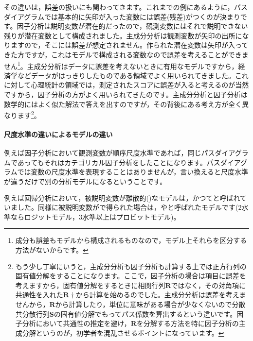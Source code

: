 \documentclass{ltjsbook}
\begin{document}
その違いは，誤差の扱いにも関わってきます。これまでの例にあるように，パスダイアグラムでは基本的に矢印が入った変数には誤差(残差)がつくのが決まりです。因子分析は説明変数が潜在的だったので，観測変数にはそれで説明できない残りが潜在変数として構成されました。主成分分析は観測変数が矢印の出所になりますので，そこには誤差が想定されません。作られた潜在変数は矢印が入ってきた方ですが，これはモデルで構成される変数なので誤差を考えることができません\footnote{成分も誤差もモデルから構成されるものなので，モデル上それらを区分する方法がないからです。}。主成分分析はデータに誤差を考えないときに有用なモデルですから，経済学などデータがはっきりしたものである領域でよく用いられてきました。これに対して心理統計の領域では，測定されたスコアに誤差が入ると考えるのが当然ですから，因子分析の方がよく用いられてきたのです。主成分分析と因子分析は数学的にはよく似た解法で答えを出すのですが，その背後にある考え方が全く異なります\footnote{もう少し丁寧にいうと，主成分分析も因子分析も計算する上では正方行列の固有値分解をすることになります。ここで，因子分析の場合は項目に誤差を考えますから，固有値分解をするときに相関行列$\bm{R}$ではなく，その対角項に共通性を入れた$\bm{R}\dagger$から計算を始めるのでした。主成分分析は誤差を考えませんから，$\bm{R}$から計算したり，単位に意味がある場合が少なくないので分散共分散行列$\bm{S}$の固有値分解でもってパス係数を算出するという違いです。因子分析において共通性の推定を避け，$\bm{R}$を分解する方法を特に因子分析の主成分解というのが，初学者を混乱させるポイントになっています。}。

\paragraph{尺度水準の違いによるモデルの違い}

例えば因子分析において観測変数が順序尺度水準であれば，同じパスダイアグラムであってもそれはカテゴリカル因子分析をしたことになります。パスダイアグラムでは変数の尺度水準を表現することはありませんが，言い換えると尺度水準が違うだけで別の分析モデルになるということです。

例えば回帰分析において，被説明変数が離散的()なモデルは，かつてと呼ばれていました。同様に被説明変数がで得られた場合は，やと呼ばれたモデルです(2水準ならロジットモデル，3水準以上はプロビットモデル)。
\end{document}
